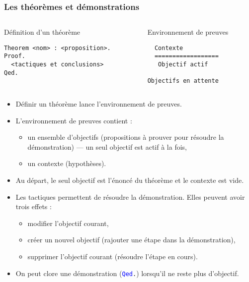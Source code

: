 \documentclass[9pt]{beamer}
\newenvironment{code}[1][Code]{\begin{block}{#1}}{\end{block}}
\newcommand{\coq}[1]{\texttt{\textcolor{blue}{#1}}}
\begin{document}
\begin{frame}[containsverbatim]
\frametitle{Les théorèmes et démonstrations}

\begin{columns}[t]
  \begin{column}{5cm}
    \begin{code}[Définition d'un théorème]
    \begin{lstlisting}
Theorem <nom> : <proposition>.
Proof.
  <tactiques et conclusions>
Qed.
    \end{lstlisting}
    \end{code}
  \end{column}
  \begin{column}{5cm}
    \begin{code}[Environnement de preuves]
    \begin{lstlisting}
  Contexte
  ==================
   Objectif actif

Objectifs en attente
    \end{lstlisting}
    \end{code}
  \end{column}
\end{columns} 

\begin{itemize}
  \item Définir un théorème lance l'environnement de preuves.
  \item L'environnement de preuves contient :
  \begin{itemize}
   \item un ensemble d'objectifs (propositions à prouver pour résoudre la démonstration) --- un seul objectif est actif à la fois,
   \item un contexte (hypothèses).
  \end{itemize}
  \item Au départ, le seul objectif est l'énoncé du théorème et le contexte est vide.
  \item Les tactiques permettent de résoudre la démonstration. Elles peuvent avoir trois effets :
  \begin{itemize}
    \item modifier l'objectif courant,
    \item créer un nouvel objectif (rajouter une étape dans la démonstration),
    \item supprimer l'objectif courant (résoudre l'étape en cours).
  \end{itemize}
  \item On peut clore une démonstration (\coq{Qed}\texttt{.}) lorsqu'il ne reste plus d'objectif.
\end{itemize}

\end{frame}
\end{document}
